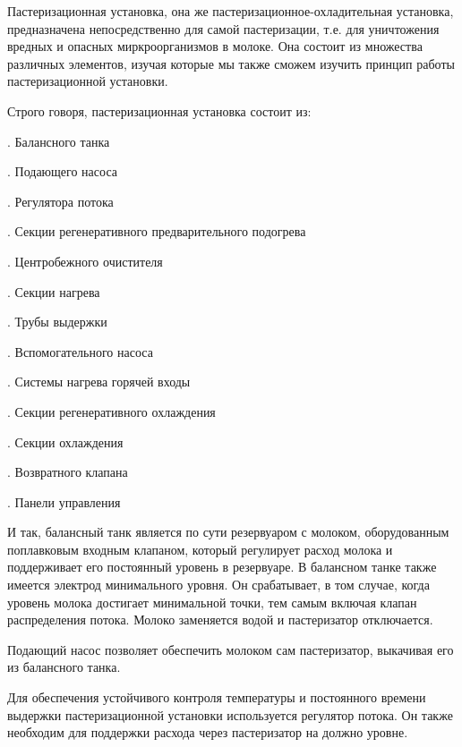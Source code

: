 {\gostFont

  \par \redline Пастеризационная установка, она же пастеризационное-охладительная установка, предназначена непосредственно для самой пастеризации, т.е. для уничтожения вредных и опасных миркроорганизмов в молоке. Она состоит из множества различных элементов, изучая которые мы также сможем изучить принцип работы пастеризационной установки.  

  \par \redline Строго говоря, пастеризационная установка состоит из: 

  \par {}. Балансного танка
  \par {}. Подающего насоса
  \par {}. Регулятора потока
  \par {}. Секции регенеративного предварительного подогрева
  \par {}. Центробежного очистителя
  \par {}. Секции нагрева
  \par {}. Трубы выдержки
  \par {}. Вспомогательного насоса
  \par {}. Системы нагрева горячей входы
  \par {}. Секции регенеративного охлаждения
  \par {}. Секции охлаждения
  \par {}. Возвратного клапана
  \par {}. Панели управления

  \par \redline И так, балансный танк является по сути резервуаром с молоком, оборудованным поплавковым входным клапаном, который регулирует расход молока и поддерживает его постоянный уровень в резервуаре. В балансном танке также имеется электрод минимального уровня. Он срабатывает, в том случае, когда уровень молока достигает минимальной точки, тем самым включая клапан распределения потока. Молоко заменяется водой и пастеризатор отключается. 

  \par \redline Подающий насос позволяет обеспечить молоком сам пастеризатор, выкачивая его из балансного танка. 

  \par \redline Для обеспечения устойчивого контроля температуры и постоянного времени выдержки пастеризационной установки используется регулятор потока. Он также необходим для поддержки расхода через пастеризатор на должно уровне.

}
